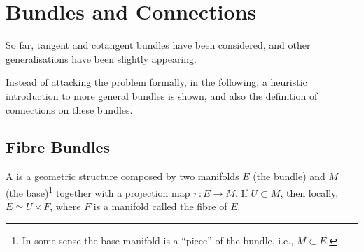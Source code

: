 
\chapter{Bundles and Connections}

So far, tangent and cotangent bundles have been considered, and other generalisations have been slightly appearing.

Instead of attacking the problem formally, in the following, a heuristic introduction to more general bundles is shown, and also the definition of connections on these bundles.

\section{Fibre Bundles}

A \emph{} is a geometric structure composed by two manifolds $E$ (the bundle) and $M$ (the base)\footnote{In some sense the base manifold is a ``piece'' of the bundle, i.e., $M \subset E$.} together with a projection map $\pi: E \to M$. If $U \subset M$, then locally, $E \simeq U \times F$, where $F$ is a manifold called the fibre of $E$. 

